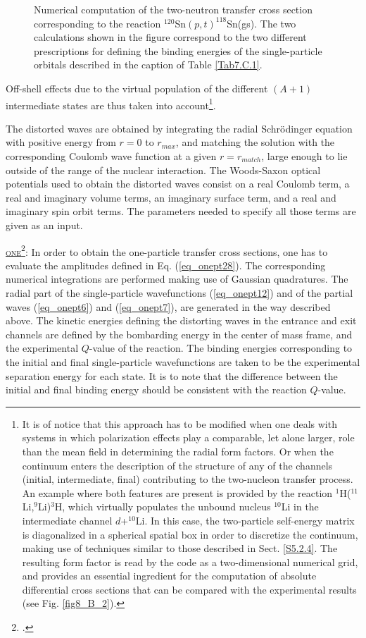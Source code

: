 \begin{subappendices}
\begin{figure}
	\caption{Numerical computation of the two-neutron transfer cross section corresponding to the reaction $^{120}$Sn$(p,t)^{118}$Sn(gs). The two calculations shown in the figure correspond to the two different prescriptions for defining the binding energies of the single-particle orbitals described in the  caption of Table \ref{Tab7.C.1}.}\label{fig7.C.1}
\end{figure}
Off-shell effects due to the virtual population of the different $(A+1)$ intermediate states are thus taken into account\footnote{It is of notice that this approach has to be modified when one deals with systems in which polarization effects play a comparable, let alone larger, role than the mean field in determining the radial form factors. Or when the continuum enters the description of the structure of any of the channels (initial, intermediate, final) contributing to the two-nucleon transfer process. An example where both features are present is provided by the reaction $^1$H($^{11}$Li,$^9$Li)$^{3}$H, which virtually populates the unbound nucleus $^{10}$Li in the intermediate channel $d$+$^{10}$Li. In this case, the two-particle self-energy matrix is diagonalized in a spherical spatial box in order to discretize the continuum, making use of  techniques similar to those described in Sect. \ref{S5.2.4}. The resulting form factor is read by the code  as a two-dimensional numerical grid, and provides an essential ingredient for the computation of absolute differential cross sections that can be compared with the experimental results  (see Fig. \ref{fig8_B_2}).}.
 
 
The distorted waves are obtained by integrating the radial Schr\"odinger equation with positive energy from $r=0$ to $r_{max}$, and matching the solution with the corresponding Coulomb wave function at a given $r=r_{match}$, large enough to lie outside of the range of the nuclear interaction. The  Woods-Saxon optical potentials  used to obtain the distorted waves consist on a real Coulomb term, a real and imaginary volume terms, an imaginary surface term, and a real and imaginary spin orbit terms. The parameters needed to specify all those terms are given as an input.  



\underline{\textsc{one}}\footnote{\cite{Potel:12b}.}: In order to obtain the  one-particle transfer cross sections, one has to evaluate  the amplitudes defined in Eq. (\ref{eq_onept28}). The corresponding numerical integrations are   performed making use of Gaussian quadratures. The radial part of the single-particle  wavefunctions (\ref{eq_onept12}) and of the partial waves (\ref{eq_onept6}) and (\ref{eq_onept7}), are generated in the way described above. The kinetic energies defining the distorting waves in the entrance and exit channels are defined by the bombarding energy in the center of mass frame, and the experimental $Q$-value of the reaction. The binding energies corresponding to the initial and final single-particle wavefunctions are taken to be the experimental separation energy for each state. It is to note that the difference between the initial and final binding energy should be consistent with the reaction $Q$-value.  




\end{subappendices}
